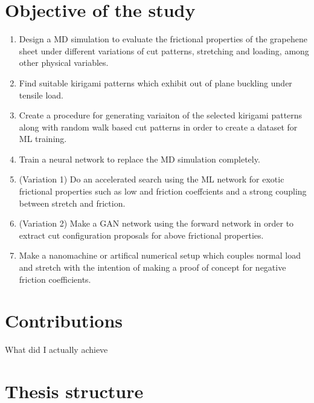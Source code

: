 
%
\section{Objective of the study}

\begin{enumerate}
    \item Design a MD simulation to evaluate the frictional properties of the
    grapehene sheet under different variations of cut patterns, stretching and
    loading, among other physical variables.
    \item Find suitable kirigami patterns which exhibit out of plane buckling under tensile load.
    \item Create a procedure for generating variaiton of the selected kirigami patterns along with random walk based cut patterns in order to create a dataset for ML training. 
    \item Train a neural network to replace the MD simulation completely.
    \item (Variation 1) Do an accelerated search using the ML network for exotic
    frictional properties such as low and friction coeffcients and a strong
    coupling between stretch and friction. 
    \item (Variation 2) Make a GAN network using the forward network in order to extract cut configuration proposals for above frictional properties.
    \item Make a nanomachine or artifical numerical setup which couples normal load and stretch with the intention of making a proof of concept for negative friction coefficients. 
\end{enumerate}


\section{Contributions}

What did I actually achieve

\section{Thesis structure}


